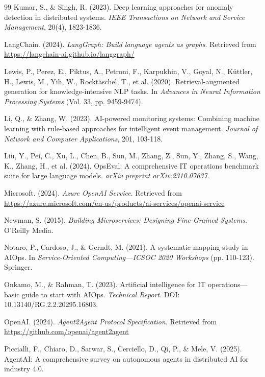 \documentclass{article}
\begin{document}
\begin{thebibliography}{99}
Kumar, S., \& Singh, R. (2023). Deep learning approaches for anomaly detection in distributed systems. \textit{IEEE Transactions on Network and Service Management}, 20(4), 1823-1836.

LangChain. (2024). \textit{LangGraph: Build language agents as graphs}. Retrieved from \url{https://langchain-ai.github.io/langgraph/}

Lewis, P., Perez, E., Piktus, A., Petroni, F., Karpukhin, V., Goyal, N., Küttler, H., Lewis, M., Yih, W., Rocktäschel, T., et al. (2020). Retrieval-augmented generation for knowledge-intensive NLP tasks. In \textit{Advances in Neural Information Processing Systems} (Vol. 33, pp. 9459-9474).

Li, Q., \& Zhang, W. (2023). AI-powered monitoring systems: Combining machine learning with rule-based approaches for intelligent event management. \textit{Journal of Network and Computer Applications}, 201, 103-118.

Liu, Y., Pei, C., Xu, L., Chen, B., Sun, M., Zhang, Z., Sun, Y., Zhang, S., Wang, K., Zhang, H., et al. (2024). OpsEval: A comprehensive IT operations benchmark suite for large language models. \textit{arXiv preprint arXiv:2310.07637}.

Microsoft. (2024). \textit{Azure OpenAI Service}. Retrieved from \url{https://azure.microsoft.com/en-us/products/ai-services/openai-service}

Newman, S. (2015). \textit{Building Microservices: Designing Fine-Grained Systems}. O'Reilly Media.

Notaro, P., Cardoso, J., \& Gerndt, M. (2021). A systematic mapping study in AIOps. In \textit{Service-Oriented Computing—ICSOC 2020 Workshops} (pp. 110-123). Springer.

Onkamo, M., \& Rahman, T. (2023). Artificial intelligence for IT operations—basic guide to start with AIOps. \textit{Technical Report}. DOI: 10.13140/RG.2.2.20295.16803.

OpenAI. (2024). \textit{Agent2Agent Protocol Specification}. Retrieved from \url{https://github.com/openai/agent2agent}

Piccialli, F., Chiaro, D., Sarwar, S., Cerciello, D., Qi, P., \& Mele, V. (2025). AgentAI: A comprehensive survey on autonomous agents in distributed AI for industry 4.0.


\end{thebibliography}
\end{document}
